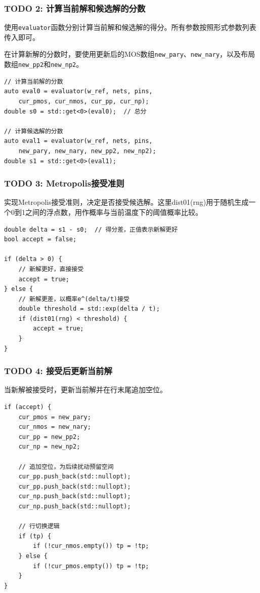 \documentclass[UTF8,12pt,a4paper]{ctexart}
\begin{document}
\subsubsection{TODO 2: 计算当前解和候选解的分数}

使用\texttt{evaluator}函数分别计算当前解和候选解的得分。所有参数按照形式参数列表传入即可。

在计算新解的分数时，要使用更新后的MOS数组\texttt{new\_pary}、\texttt{new\_nary}，以及布局数组\texttt{new\_pp2}和\texttt{new\_np2}。

\begin{lstlisting}
// 计算当前解的分数
auto eval0 = evaluator(w_ref, nets, pins, 
    cur_pmos, cur_nmos, cur_pp, cur_np);
double s0 = std::get<0>(eval0);  // 总分

// 计算候选解的分数
auto eval1 = evaluator(w_ref, nets, pins, 
    new_pary, new_nary, new_pp2, new_np2);
double s1 = std::get<0>(eval1);
\end{lstlisting}

\subsubsection{TODO 3: Metropolis接受准则}

实现Metropolis接受准则，决定是否接受候选解。这里dist01(rng)用于随机生成一个0到1之间的浮点数，用作概率与当前温度下的阈值概率比较。

\begin{lstlisting}
double delta = s1 - s0;  // 得分差，正值表示新解更好
bool accept = false;

if (delta > 0) {
    // 新解更好，直接接受
    accept = true;
} else {
    // 新解更差，以概率e^(delta/t)接受
    double threshold = std::exp(delta / t);
    if (dist01(rng) < threshold) {
        accept = true;
    }
}
\end{lstlisting}

\subsubsection{TODO 4: 接受后更新当前解}

当新解被接受时，更新当前解并在行末尾追加空位。

\begin{lstlisting}
if (accept) {
    cur_pmos = new_pary;
    cur_nmos = new_nary;
    cur_pp = new_pp2;
    cur_np = new_np2;
    
    // 追加空位，为后续扰动预留空间
    cur_pp.push_back(std::nullopt);
    cur_pp.push_back(std::nullopt);
    cur_np.push_back(std::nullopt);
    cur_np.push_back(std::nullopt);
    
    // 行切换逻辑
    if (tp) {
        if (!cur_nmos.empty()) tp = !tp;
    } else {
        if (!cur_pmos.empty()) tp = !tp;
    }
}
\end{lstlisting}
\end{document}
